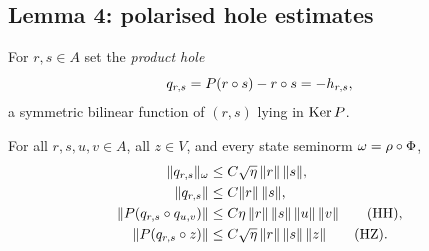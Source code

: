 \subsection*{Lemma 4: polarised hole estimates}

For $r,s\in A$ set the \emph{product hole}
\[
  q_{r,s}=P(r\circ s)-r\circ s=-h_{r,s},
\]
a symmetric bilinear function of $(r,s)$ lying in $\operatorname{Ker} P$.

\begin{lemma}\label{lem:bridge-polar}
For all $r,s,u,v\in A$, all $z\in V$, and every state seminorm
$\omega=\rho\circ\Phi$,
\begin{align}
  \lVert q_{r,s} \rVert_\omega&\le C\sqrt\eta\,\lVert r \rVert\,\lVert s \rVert, \label{eq:bridge-41}\\
  \lVert q_{r,s} \rVert&\le C\lVert r \rVert\,\lVert s \rVert, \label{eq:bridge-crude}\\
  \lVert P(q_{r,s}\circ q_{u,v}) \rVert
    &\le C\eta\,\lVert r \rVert\,\lVert s \rVert\,\lVert u \rVert\,\lVert v \rVert
    \qquad\text{\normalfont(HH)}, \label{eq:bridge-HH}\\
  \lVert P(q_{r,s}\circ z) \rVert
    &\le C\sqrt\eta\,\lVert r \rVert\,\lVert s \rVert\,\lVert z \rVert
    \qquad\text{\normalfont(HZ)}. \label{eq:bridge-HZ}
\end{align}
\end{lemma}

